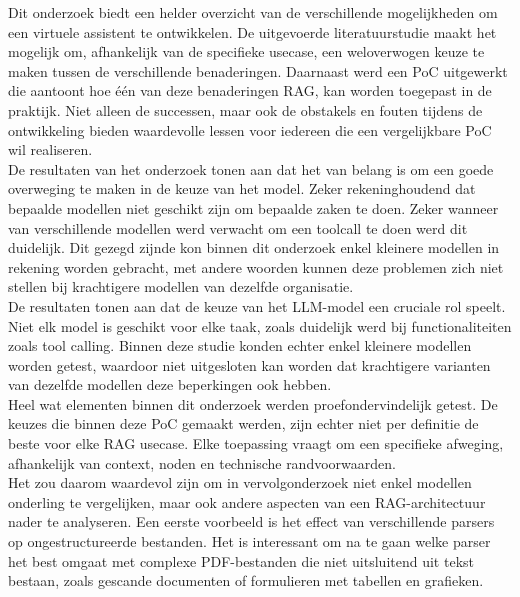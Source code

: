 Dit onderzoek biedt een helder overzicht van de verschillende mogelijkheden om een virtuele assistent te ontwikkelen. De uitgevoerde literatuurstudie maakt het mogelijk om, afhankelijk van de specifieke usecase, een weloverwogen keuze te maken tussen de verschillende benaderingen. Daarnaast werd een PoC uitgewerkt die aantoont hoe één van deze benaderingen RAG, kan worden toegepast in de praktijk. Niet alleen de successen, maar ook de obstakels en fouten tijdens de ontwikkeling bieden waardevolle lessen voor iedereen die een vergelijkbare PoC wil realiseren.
\\[1em]
De resultaten van het onderzoek tonen aan dat het van belang is om een goede overweging te maken in de keuze van het model. Zeker rekeninghoudend dat bepaalde modellen niet geschikt zijn om bepaalde zaken te doen. Zeker wanneer van verschillende modellen werd verwacht om een toolcall te doen werd dit duidelijk. Dit gezegd zijnde kon binnen dit onderzoek enkel kleinere modellen in rekening worden gebracht, met andere woorden kunnen deze problemen zich niet stellen bij krachtigere modellen van dezelfde organisatie. 
\\[1em]
De resultaten tonen aan dat de keuze van het LLM-model een cruciale rol speelt. Niet elk model is geschikt voor elke taak, zoals duidelijk werd bij functionaliteiten zoals tool calling. Binnen deze studie konden echter enkel kleinere modellen worden getest, waardoor niet uitgesloten kan worden dat krachtigere varianten van dezelfde modellen deze beperkingen ook hebben.
\\[1em]
Heel wat elementen binnen dit onderzoek werden proefondervindelijk getest. De keuzes die binnen deze PoC gemaakt werden, zijn echter niet per definitie de beste voor elke RAG usecase. Elke toepassing vraagt om een specifieke afweging, afhankelijk van context, noden en technische randvoorwaarden.
\\[1em]
Het zou daarom waardevol zijn om in vervolgonderzoek niet enkel modellen onderling te vergelijken, maar ook andere aspecten van een RAG-architectuur nader te analyseren. Een eerste voorbeeld is het effect van verschillende parsers op ongestructureerde bestanden. Het is interessant om na te gaan welke parser het best omgaat met complexe PDF-bestanden die niet uitsluitend uit tekst bestaan, zoals gescande documenten of formulieren met tabellen en grafieken.
